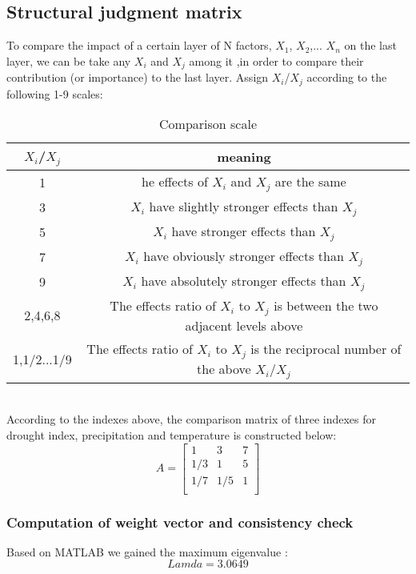 \documentclass{mcmthesis}
\begin{document}
\subsection{Structural judgment matrix}
To compare the impact of a certain layer of N factors, $X_1$, $X_2$,... $X_n$ on the last layer, we can be take any $X_i$ and $X_j$ among it ,in order to compare their contribution (or importance) to the last layer. Assign $X_i$/$X_j$ according to the following 1-9 scales:

\begin{table}[htbp]
\centering
\caption{Comparison scale}
\begin{tabular}{c|c}  
\hline
$X_i$/$X_j$ & meaning \\%
\hline
1 & he effects of $X_i$ and $X_j$ are the same \\
\hline
3 &  $X_i$ have slightly stronger effects than $X_j$\\
\hline
5	& $X_i$ have stronger effects than $X_j$\\
\hline
7 & $X_i$ have obviously stronger effects than $X_j$\\
\hline
9 & $X_i$ have absolutely stronger effects than $X_j$\\
\hline
2,4,6,8 & The effects ratio of $X_i$ to $X_j$ is between the two adjacent levels above\\
\hline
1,1/2...1/9 & The effects ratio of $X_i$ to $X_j$ is the reciprocal number of the above $X_i$/$X_j$
\\
\hline
\end{tabular}
\end{table}

~\\

According to the indexes above,  the comparison matrix of three indexes for drought index, precipitation and temperature is constructed below:
\begin{equation}
A={
\left[ \begin{array}{ccc}
1 &3 &7\\
   1/3 &1& 5\\
   1/7 &1/5 &1\\

\end{array} 
\right ]}
\end{equation}

\subsubsection{Computation of weight vector and consistency check}
Based on MATLAB we gained the maximum eigenvalue :
\[Lamda = 3.0649\]
\end{document}
